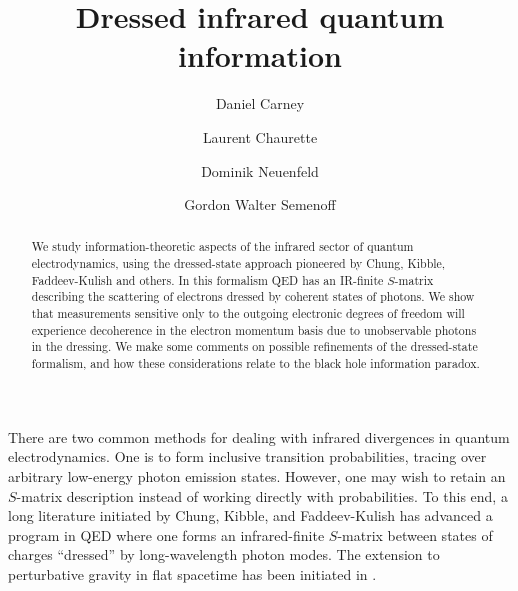 \documentclass[twocolumn,prd]{revtex4}
\begin{document}
\title{Dressed infrared quantum information}

  \author{Daniel Carney}
  \author{Laurent Chaurette}
  \author{Dominik Neuenfeld}
  \author{Gordon Walter Semenoff}
      
 
 
\begin{abstract}
We study information-theoretic aspects of the infrared sector of quantum electrodynamics, using the dressed-state approach pioneered by Chung, Kibble, Faddeev-Kulish and others. In this formalism QED has an IR-finite $S$-matrix describing the scattering of electrons dressed by coherent states of photons. We show that measurements sensitive only to the outgoing electronic degrees of freedom will experience decoherence in the electron momentum basis due to unobservable photons in the dressing. We make some comments on possible refinements of the dressed-state formalism, and how these considerations relate to the black hole information paradox.
\end{abstract}










\maketitle

There are two common methods for dealing with infrared divergences in quantum electrodynamics. One is to form inclusive transition probabilities, tracing over arbitrary low-energy photon emission states.\cite{Bloch:1937pw,suura,Weinberg:1965nx} However, one may wish to retain an $S$-matrix description instead of working directly with probabilities. To this end, a long literature initiated by Chung, Kibble, and Faddeev-Kulish has advanced a program in QED where one forms an infrared-finite $S$-matrix between states of charges ``dressed'' by long-wavelength photon modes.\cite{Dirac:1955uv,dollard,Chung:1965zza,kibble,Kulish:1970ut,Zwanziger:1974jz,Kapec:2017tkm} The extension to perturbative gravity in flat spacetime has been initiated in \cite{Ware:2013zja}.
\end{document}
